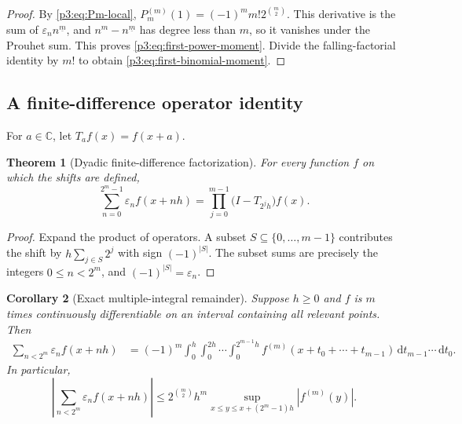 \documentclass[11pt,oneside]{article}
\newtheorem{theorem}{Theorem}[section]
\newtheorem{corollary}[theorem]{Corollary}
\theoremstyle{definition}
\theoremstyle{remark}
\newcommand{\C}{\mathbb C}
\newcommand{\dd}{\,\mathrm d}
\newcommand{\eps}{\varepsilon}
\newcommand{\fall}[2]{#1^{\underline{#2}}}
\newcommand{\1}{\mathbf 1}
\begin{document}
\begin{proof}
By \eqref{p3:eq:Pm-local},
\(P_m^{(m)}(1)=(-1)^m m!2^{\binom m2}\).  This derivative is the sum of
\(\eps_n\fall nm\), and \(n^m-\fall nm\) has degree less than \(m\), so it vanishes under the
Prouhet sum.  This proves \eqref{p3:eq:first-power-moment}.  Divide the falling-factorial identity
by \(m!\) to obtain \eqref{p3:eq:first-binomial-moment}.
\end{proof}

\subsection{A finite-difference operator identity}

For \(a\in\C\), let \(T_a f(x)=f(x+a)\).

\begin{theorem}[Dyadic finite-difference factorization]
\label{p3:thm:operator}
For every function \(f\) on which the shifts are defined,
\begin{equation}
 \boxed{
 \sum_{n=0}^{2^m-1}\eps_n f(x+nh)
 =\prod_{j=0}^{m-1}\bigl(I-T_{2^jh}\bigr)f(x).}
 \label{p3:eq:operator-factor}
\end{equation}
\end{theorem}

\begin{proof}
Expand the product of operators.  A subset \(S\subseteq\{0,\ldots,m-1\}\) contributes the
shift by \(h\sum_{j\in S}2^j\) with sign \((-1)^{|S|}\).  The subset sums are precisely the
integers \(0\le n<2^m\), and \((-1)^{|S|}=\eps_n\).
\end{proof}

\begin{corollary}[Exact multiple-integral remainder]
\label{p3:cor:integral-remainder}
Suppose \(h\ge0\) and \(f\) is \(m\) times continuously differentiable on an interval
containing all relevant points.  Then
\begin{align}
 \sum_{n<2^m}\eps_nf(x+nh)
 &=(-1)^m
 \int_0^h\int_0^{2h}\cdots\int_0^{2^{m-1}h}
 f^{(m)}(x+t_0+\cdots+t_{m-1})
 \dd t_{m-1}\cdots\dd t_0.                                \label{p3:eq:integral-remainder}
\end{align}
In particular,
\begin{equation}
 \left|\sum_{n<2^m}\eps_nf(x+nh)\right|
 \le 2^{\binom m2}h^m
 \sup_{x\le y\le x+(2^m-1)h}|f^{(m)}(y)|.
 \label{p3:eq:difference-bound}
\end{equation}
\end{corollary}
\end{document}

